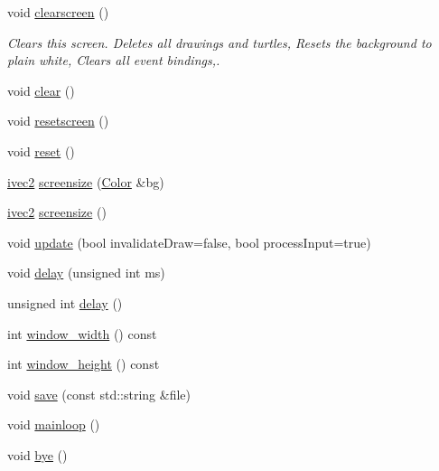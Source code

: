 \begin{DoxyCompactItemize}
void \hyperlink{classcturtle_1_1InteractiveTurtleScreen_ae4e184867d7ed83c58e0ef9e730f4d73}{clearscreen} ()
\begin{DoxyCompactList}\small\item\em Clears this screen. Deletes all drawings and turtles, Resets the background to plain white, Clears all event bindings,. \end{DoxyCompactList}\item 
void \hyperlink{classcturtle_1_1InteractiveTurtleScreen_a60eecd547f88d1e52b1d0917693bffb8}{clear} ()
\item 
void \hyperlink{classcturtle_1_1InteractiveTurtleScreen_a06471bf6c8c02768fb0acd89649c72c2}{resetscreen} ()
\item 
void \hyperlink{classcturtle_1_1InteractiveTurtleScreen_a2863ede773ae592ad119b317b3704ce8}{reset} ()
\item 
\hyperlink{structcturtle_1_1ivec2}{ivec2} \hyperlink{classcturtle_1_1InteractiveTurtleScreen_a005b25693386718a6d80feeac677d255}{screensize} (\hyperlink{classcturtle_1_1Color}{Color} \&bg)
\item 
\hyperlink{structcturtle_1_1ivec2}{ivec2} \hyperlink{classcturtle_1_1InteractiveTurtleScreen_a1263d763eb9ef1b39f2e8c0a445d6a85}{screensize} ()
\item 
void \hyperlink{classcturtle_1_1InteractiveTurtleScreen_adfefb43645347feb832072f8fc8da144}{update} (bool invalidate\+Draw=false, bool process\+Input=true)
\item 
void \hyperlink{classcturtle_1_1InteractiveTurtleScreen_a6e32b852cbd029d6649107d838c798a9}{delay} (unsigned int ms)
\item 
unsigned int \hyperlink{classcturtle_1_1InteractiveTurtleScreen_a2776d2a194e14b7adbc94ce502ee9409}{delay} ()
\item 
int \hyperlink{classcturtle_1_1InteractiveTurtleScreen_aefeb4e90fae07d043677f3dee9a29026}{window\+\_\+width} () const
\item 
int \hyperlink{classcturtle_1_1InteractiveTurtleScreen_a259883332b284e3b8a97b5bfb74f988d}{window\+\_\+height} () const
\item 
void \hyperlink{classcturtle_1_1InteractiveTurtleScreen_ab0ded9c577f523ca45240e036318553e}{save} (const std\+::string \&file)
\item 
void \hyperlink{classcturtle_1_1InteractiveTurtleScreen_a0b6a0f18333312f7d502b3d9a511143e}{mainloop} ()
\item 
void \hyperlink{classcturtle_1_1InteractiveTurtleScreen_a045b2cc0c8869140015abcc11226a714}{bye} ()

\end{DoxyCompactItemize}
